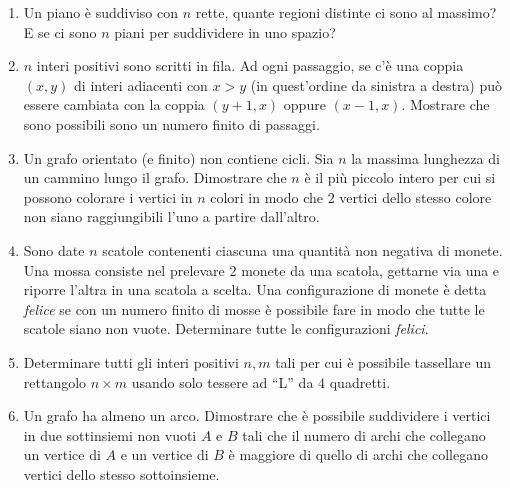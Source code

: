 \documentclass[a4paper,10pt]{article}
\begin{document}
\begin{enumerate}
	Nel mese di gennaio, lo gnomo Gennaio va a trovare tutti i suoi amici.  Se nota che la maggioranza stretta dei suoi amici ha la casetta di un colore diverso dalla sua, allora entro la fine del mese egli ridipinge la sua casetta, cambiando il colore per ``adeguarsi alla maggioranza degli altri''.

	Nel mese di febbraio, tocca allo gnomo Febbraio fare visita ai suoi amici ed eventualmente ridipingere la casetta per ``adeguarsi alla maggioranza'', e cos\`{\i} via.

	Questa procedura si ripete di anno in anno.  Si dimostri che, da un certo momento in poi, nessuno gnomo avr\`{a} pi\`{u} bisogno di ridipingere la sua casetta (si supponga l'amicizia simmetrica, e che ogni gnomo non includa se stesso nella lista dei suoi amici).

	\item Un piano \`e suddiviso con $n$ rette, quante regioni distinte ci sono al massimo? E se ci sono $n$ piani per suddividere in uno spazio?

	\item $n$ interi positivi sono scritti in fila. Ad ogni passaggio, se c'\`e una coppia $(x,y)$ di interi adiacenti con $x>y$ (in quest'ordine da sinistra a destra) pu\`o essere cambiata con la coppia $(y+1,x)$ oppure $(x-1,x)$. Mostrare che sono possibili sono un numero finito di passaggi.

	\item Un grafo orientato (e finito) non contiene cicli. Sia $n$ la massima lunghezza di un cammino lungo il grafo. Dimostrare che $n$ \`e il pi\`u piccolo intero per cui si possono colorare i vertici in $n$ colori in modo che $2$ vertici dello stesso colore non siano raggiungibili l'uno a partire dall'altro.

	\item Sono date $n$ scatole contenenti ciascuna una quantit\`a non negativa di monete. Una mossa consiste nel prelevare $2$ monete da una scatola, gettarne via una e riporre l'altra in una scatola a scelta. Una configurazione di monete \`e detta \textit{felice} se con un numero finito di mosse \`e possibile fare in modo che tutte le scatole siano non vuote. Determinare tutte le configurazioni \textit{felici}.
	
	\item Determinare tutti gli interi positivi $n,m$ tali per cui \`e possibile tassellare un rettangolo $n \times m$ usando solo tessere ad ``L'' da $4$ quadretti.

	\item Un grafo ha almeno un arco. Dimostrare che \`e possibile suddividere i vertici in due sottinsiemi non vuoti $A$ e $B$ tali che il numero di archi che collegano un vertice di $A$ e un vertice di $B$ \`e maggiore di quello di archi che collegano vertici dello stesso sottoinsieme.


\end{enumerate}
\end{document}
